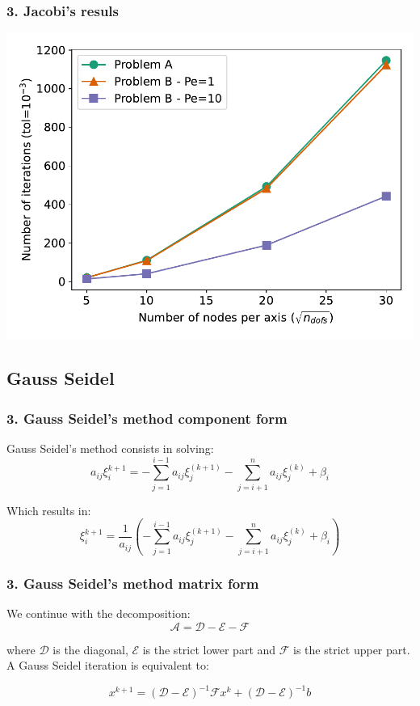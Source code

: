 \begin{frame}
\frametitle{\textbf{3. Jacobi's resuls}}
	
\begin{center}
\includegraphics[width=0.95\linewidth]{images/j_its}
\end{center}
\end{frame}

\subsection{Gauss Seidel}
\begin{frame} 
	\frametitle{\textbf{3. Gauss Seidel's method component form}}
	
	Gauss Seidel's method consists in solving:
	\[
	a_{ij} \xi_i^{k+1} = - \sum_{j=1}^{i-1} a_{ij} \xi_j^{(k+1)} - \sum_{j=i+1}^n a_{ij} \xi_j^{(k)} + \beta_i
	\]
	
Which results in:
\[
\xi_i^{k+1} = \frac{1}{a_{ij}} \left( - \sum_{j=1}^{i-1} a_{ij} \xi_j^{(k+1)} - \sum_{j=i+1}^n a_{ij} \xi_j^{(k)} + \beta_i \right)
\]
	
\end{frame}

\begin{frame} 
	\frametitle{\textbf{3. Gauss Seidel's method matrix form}}
	
	We continue with the decomposition:
	\[
	\mathcal{A} = \mathcal{D} - \mathcal{E}-\mathcal{F}
	\]
	
	where $\mathcal{D}$ is the diagonal, $\mathcal{E}$ is the strict lower part and $\mathcal{F}$ is the strict upper part. A Gauss Seidel iteration is equivalent to:
	
	\[
	x^{k+1} = \left(\mathcal{D}-\mathcal{E}\right)^{-1}\mathcal{F}x^{k} +  \left(\mathcal{D}-\mathcal{E}\right)^{-1} b
	\]
	
\end{frame}

